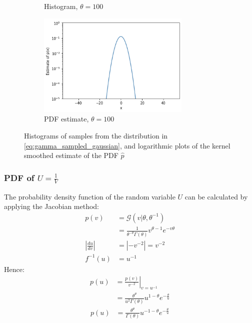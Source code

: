 \documentclass[a4paper]{article}
\begin{document}
\begin{figure}[H]
\begin{subfigure}[b]{0.45\textwidth}
        \caption{Histogram, $\theta = 100$}
        \label{fig:gamma_sampled_gaussian_histogram_100}
    \end{subfigure}
    \hfill
    \begin{subfigure}[b]{0.45\textwidth}
        \centering
        \includegraphics[width=0.8\textwidth]{figures/gamma_sampled_gaussian_smoothed_100.png}
        \caption{PDF estimate, $\theta = 100$}
        \label{fig:gamma_sampled_gaussian_smoothed_100}
    \end{subfigure}
    \caption{Histograms of samples from the distribution in \autoref{eq:gamma_sampled_gaussian},
    and logarithmic plots of the kernel smoothed estimate of the PDF $\hat{p}$}
    \label{fig:gamma_sampled_gaussian}
\end{figure}

\subsubsection{PDF of $U=\frac{1}{V}$}
The probability density function of the random variable $U$ can be calculated by applying the Jacobian method:
\begin{align*}
     p(v) &= \mathcal{G}(v | \theta, \theta^{-1}) \\
    &= \frac{1}{\theta^{-\theta} \Gamma (\theta)} v^{\theta - 1} e^{-v \theta} \\
    \left| \frac{du}{dv} \right| &= \left| -v^{-2} \right| = v^{-2} \\
    f^{-1} (u) &= u^{-1}
\end{align*}
Hence:
\begin{align*}
    p(u) &= \left. \frac{p(v)}{v^{-2}} \right|_{v=u^{-1}} \\
    &= \frac{\theta^{\theta}}{u^2 \Gamma(\theta)} u^{1-\theta} e^{-\frac{\theta}{u}}
\end{align*}
\begin{align}\label{eq:pdf_of_u}
    p(u) &= \frac{\theta^{\theta}}{\Gamma(\theta)} u^{-1-\theta} e^{-\frac{\theta}{u}}
\end{align}
\end{document}
